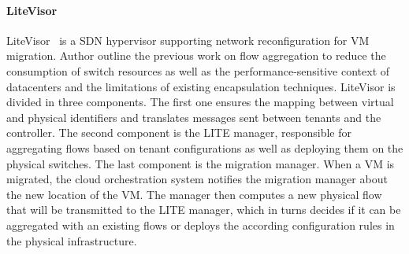 \paragraph{LiteVisor}
LiteVisor~\cite{Litevisor-Yang2018} is a SDN hypervisor supporting network reconfiguration for VM migration.
Author outline the previous work on flow aggregation to reduce the consumption of switch resources as well as the performance-sensitive context of datacenters and the limitations of existing encapsulation techniques.
LiteVisor is divided in three components. The first one ensures the mapping between virtual and physical identifiers and translates messages sent between tenants and the controller.
The second component is the LITE manager, responsible for aggregating flows based on tenant configurations as well as deploying them on the physical switches. The last component is the migration manager. When a VM is migrated, the cloud orchestration system notifies the migration manager about the new location of the VM. The manager then computes a new physical flow that will be transmitted to the LITE manager, which in turns decides if it can be aggregated with an existing flows or deploys the according configuration rules in the physical infrastructure.
